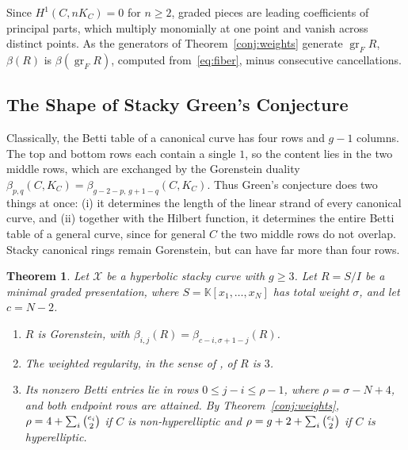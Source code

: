 \documentclass[11pt,reqno]{amsart}
\newtheorem{theorem}[lemma]{Theorem}
\theoremstyle{remark}
\newcommand{\KK}{\mathbb{K}}
\newcommand{\cX}{\mathcal{X}}
\begin{document}
Since $H^1(C,nK_C)=0$ for $n\ge2$, graded pieces are leading coefficients of principal parts, which multiply monomially at one point and vanish across distinct points. As the generators of Theorem~\ref{conj:weights} generate $\operatorname{gr}_FR$, $\beta(R)$ is $\beta(\operatorname{gr}_FR)$, computed from~\eqref{eq:fiber}, minus consecutive cancellations.
 
\subsection{The Shape of Stacky Green's Conjecture}\label{subsec:shape-stacky-green}

Classically, the Betti table of a canonical curve has four rows and $g-1$ columns. The top and bottom rows each contain a single $1$, so the content lies in the two middle rows, which are exchanged by the Gorenstein duality $\beta_{p,q}(C,K_{C})=\beta_{g-2-p,\,g+1-q}(C,K_C)$. Thus Green's conjecture does two things at once: (i) it determines the length of the linear strand of every canonical curve, and (ii) together with the Hilbert function, it determines the entire Betti table of a general curve, since for general $C$ the two middle rows do not overlap. Stacky canonical rings remain Gorenstein, but can have far more than four rows.

\begin{theorem}\label{thm:duality}
Let $\cX$ be a hyperbolic stacky curve with $g\geq3$. Let $R=S/I$ be a minimal graded presentation, where $S=\KK[x_1,\ldots,x_N]$ has total weight $\sigma$, and let $c=N-2$.
\begin{enumerate}
\item $R$ is Gorenstein, with $\beta_{i,j}(R)=\beta_{c-i,\sigma+1-j}(R)$.
\item The weighted regularity, in the sense of \cite{brownErman25}, of $R$ is $3$.
\item Its nonzero Betti entries lie in rows $0\leq j-i\leq\rho-1$, where $\rho=\sigma-N+4$, and both endpoint rows are attained. By Theorem~\ref{conj:weights}, $\rho=4+\sum_i\tbinom{e_i}{2}$ if $C$ is non-hyperelliptic and $\rho=g+2+\sum_i\tbinom{e_i}{2}$ if $C$ is hyperelliptic.
\end{enumerate}
\end{theorem}
\end{document}
